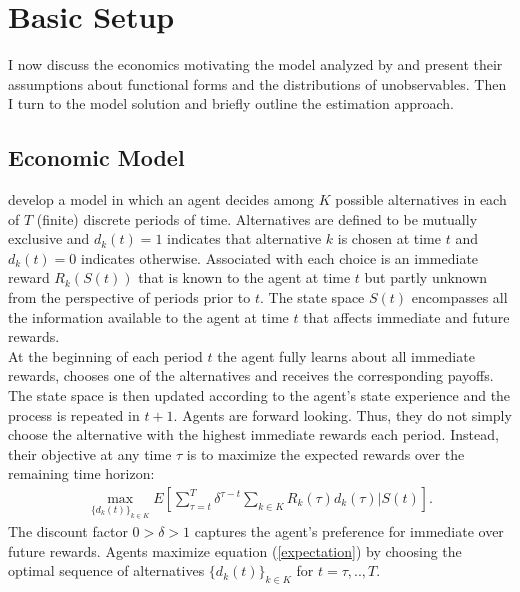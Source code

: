 \section{Basic Setup}\label{Setup}
I now discuss the economics motivating the model analyzed by \citet{Keane.1994} and present their assumptions about functional forms and the distributions of unobservables. Then I turn to the model solution and briefly outline the estimation approach.
\subsection{Economic Model}
\citet{Keane.1994} develop a model in which an agent decides among $K$ possible alternatives in each of $T$ (finite) discrete periods of time. Alternatives are defined to be mutually exclusive and $d_k(t) = 1$ indicates that alternative $k$ is chosen at time $t$ and $d_k(t)  = 0$ indicates otherwise. Associated with each choice is an immediate reward $R_k(S(t))$ that is known to the agent at time $t$ but partly unknown from the perspective of periods prior to $t$. The state space $S(t)$ encompasses all the information available to the agent at time $t$ that affects immediate and future rewards.\\\newline
%
At the beginning of each period $t$ the agent fully learns about all immediate rewards, chooses one of the alternatives and receives the corresponding payoffs. The state space is then updated according to the agent's state experience and the process is repeated in $t + 1$. Agents are forward looking. Thus, they do not simply choose the alternative with the highest immediate rewards each period. Instead, their objective at any time $\tau$ is to maximize the expected rewards over the remaining time horizon:
%
\begin{align}\label{expectation}
\max_{\{d_k(t)\}_{k \in K}} E\left[ \sum_{\tau = t}^T \delta^{\tau - t} \sum_{k\in K}R_k(\tau)d_k(\tau)\Bigg| S(t)\right].
\end{align}
%
The discount factor $0 > \delta > 1$ captures the agent's preference for immediate over future rewards. Agents maximize equation (\ref{expectation}) by choosing the optimal sequence of alternatives $\{d_k(t)\}_{k \in K}$ for $t = \tau, .., T$.\\\newline

